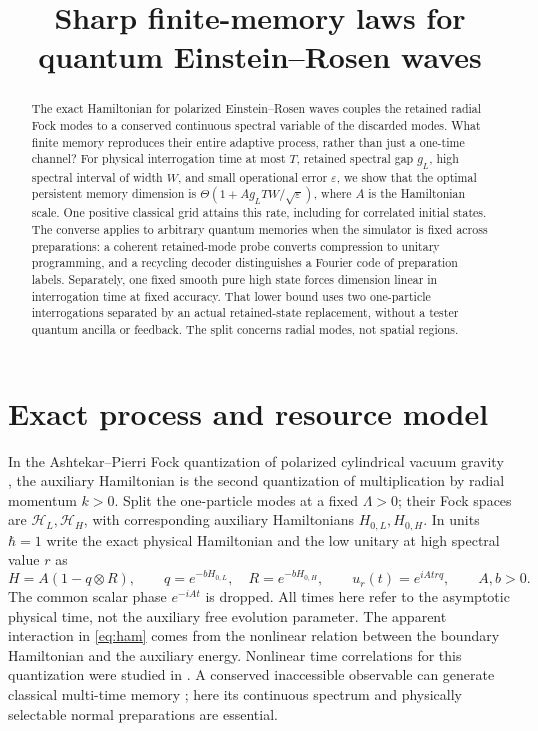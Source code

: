 \documentclass[11pt]{article}
\title{Sharp finite-memory laws for quantum Einstein--Rosen waves}
\author{}
\date{}
\theoremstyle{remark}
\begin{document}
\maketitle
\begin{abstract}
The exact Hamiltonian for polarized Einstein--Rosen waves couples the
retained radial Fock modes to a conserved continuous spectral variable
of the discarded modes. What finite memory reproduces their entire
adaptive process, rather than just a one-time channel? For physical
interrogation time at most \(T\), retained spectral gap \(g_L\), high
spectral interval of width \(W\), and small operational error
\(\varepsilon\), we show that the optimal persistent memory dimension
is \(\Theta(1+A g_L T W/\sqrt{\varepsilon})\), where \(A\) is the
Hamiltonian scale. One positive classical grid attains this rate,
including for correlated initial states. The converse applies to
arbitrary quantum memories when the simulator is fixed across
preparations: a coherent retained-mode probe converts compression to
unitary programming, and a recycling decoder distinguishes a Fourier
code of preparation labels. Separately, one fixed smooth pure high
state forces dimension linear in interrogation time at fixed accuracy.
That lower bound uses two one-particle interrogations separated by an
actual retained-state replacement, without a tester quantum ancilla or
feedback. The split concerns radial modes, not spatial regions.
\end{abstract}

\section{Exact process and resource model}\label{sec:model}

In the Ashtekar--Pierri Fock quantization of polarized cylindrical
vacuum gravity \cite{AP}, the auxiliary Hamiltonian is the
second quantization of multiplication by radial momentum \(k>0\).
Split the one-particle modes at a fixed \(\Lambda>0\); their Fock
spaces are \(\mathcal H_L,\mathcal H_H\), with corresponding auxiliary
Hamiltonians \(H_{0,L},H_{0,H}\). In units \(\hbar=1\) write the exact
physical Hamiltonian and the low unitary at high spectral value \(r\) as
\begin{equation}\label{eq:ham}
 H=A(1-q\otimes R),\qquad
 q=e^{-bH_{0,L}},\quad R=e^{-bH_{0,H}},\qquad
 u_r(t)=e^{iAtrq},\qquad A,b>0 .
\end{equation}
The common scalar phase \(e^{-iAt}\) is dropped. All times here refer
to the asymptotic physical time, not the auxiliary free evolution
parameter. The apparent interaction in \eqref{eq:ham} comes from the
nonlinear relation between the boundary Hamiltonian and the auxiliary
energy. Nonlinear time correlations for this quantization were
studied in \cite{BGV}. A conserved inaccessible observable can
generate classical multi-time memory \cite{GRS}; here its continuous
spectrum and physically selectable normal preparations are essential.
\end{document}
